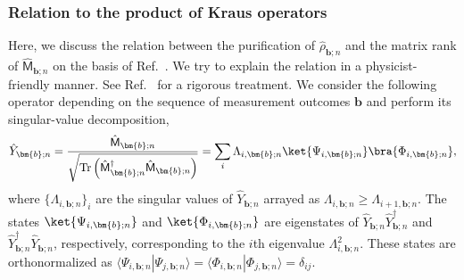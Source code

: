 \documentclass[preprint,pteplogo]{ptephy_v2}%
\numberwithin{equation}{section}
\theoremstyle{definition}
\begin{document}
\subsubsection{Relation to the product of Kraus operators}
\label{sec:rank-M_purification}
Here, we discuss the relation between the purification of $\hat{\rho}_{\bm{b};n}$ and the matrix rank of $\hat{\mathsf{M}}_{\bm{b};n}$ on the basis of Ref.~\cite{benoist2019invariant}. 
We try to explain the relation in a physicist-friendly manner. 
See Ref.~\cite{benoist2019invariant} for a rigorous treatment. 
We consider the following operator depending on the sequence of measurement outcomes $\bm{b}$ and perform its singular-value decomposition,
\begin{align}
    \hat{Y}_{\bm{b};n}=\frac{\hat{\mathsf{M}}_{\bm{b};n}}
    {\sqrt{\mathrm{Tr}\left(\hat{\mathsf{M}}_{\bm{b};n}^\dagger\hat{\mathsf{M}}_{\bm{b};n}\right)}}=\sum_i\Lambda_{i,\bm{b};n}   \ket{\Psi_{i,\bm{b};n}}\bra{\Phi_{i,\bm{b};n}},
\end{align}
where $\{\Lambda_{i,\bm{b};n}\}_i$ are the singular values of $\hat{Y}_{\bm{b};n}$ arrayed as $\Lambda_{i,\bm{b};n}\geq\Lambda_{i+1,\bm{b};n}$. 
The states $\ket{\Psi_{i,\bm{b};n}}$ and $\ket{\Phi_{i,\bm{b};n}}$ are eigenstates of $\hat{Y}_{\bm{b};n}\hat{Y}_{\bm{b};n}^\dagger$ and $\hat{Y}_{\bm{b};n}^\dagger\hat{Y}_{\bm{b};n}$, respectively, corresponding to the $i$th eigenvalue $\Lambda_{i,\bm{b};n}^2$. 
These states are orthonormalized as $\langle\Psi_{i,\bm{b};n}|\Psi_{j,\bm{b};n}\rangle=\langle\Phi_{i,\bm{b};n}|\Phi_{j,\bm{b};n}\rangle=\delta_{ij}$. 
\end{document}
